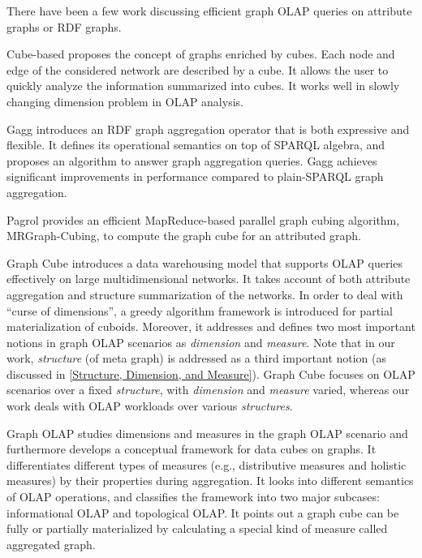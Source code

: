 There have been a few work discussing efficient graph OLAP queries on attribute graphs or RDF graphs.

Cube-based \cite{DBLP:conf/sofsem/JakawatFL16} proposes the concept of  graphs enriched by cubes. Each node and edge of the considered network are described by a cube. It allows the user to quickly analyze the information summarized into cubes. It works well in slowly changing dimension problem in OLAP analysis.

Gagg \cite{iswc15_Maali:2015aa} introduces an RDF graph aggregation operator that is both expressive and flexible. It defines its operational semantics on top of SPARQL algebra, and proposes an algorithm to answer graph aggregation queries. Gagg achieves significant improvements in performance compared to plain-SPARQL graph aggregation.

Pagrol \cite{icde14_Wang:2014aa} provides an efficient MapReduce-based parallel graph cubing algorithm, MRGraph-Cubing, to compute the graph cube for an attributed graph.

Graph Cube \cite{sigmod11_ZhaoLXH11} introduces a data warehousing model that supports OLAP queries effectively on large multidimensional networks. It takes account of both attribute aggregation and structure summarization of the networks. In order to deal with ``curse of dimensions'', a greedy algorithm framework is introduced for partial materialization of cuboids. Moreover, it addresses and defines two most important notions in graph OLAP scenarios as \textit{dimension} and \textit{measure}. Note that in our work, \textit{structure} (of meta graph) is addressed as a third important notion (as discussed in \ref{Structure, Dimension, and Measure}). Graph Cube \cite{sigmod11_ZhaoLXH11} focuses on OLAP scenarios over a fixed \textit{structure}, with \textit{dimension} and \textit{measure} varied, whereas our work deals with OLAP workloads over various \textit{structures}. %

Graph OLAP \cite{icdm08_Chen:2008aa} studies dimensions and measures in the graph OLAP scenario and furthermore develops a conceptual framework for data cubes on graphs. It differentiates different types of measures (e.g., distributive measures and holistic measures) by their properties during aggregation. It looks into different semantics of OLAP operations, and classifies the framework into two major subcases: informational OLAP and topological OLAP. It points out a graph cube can be fully or partially materialized by calculating a special kind of measure called aggregated graph.

